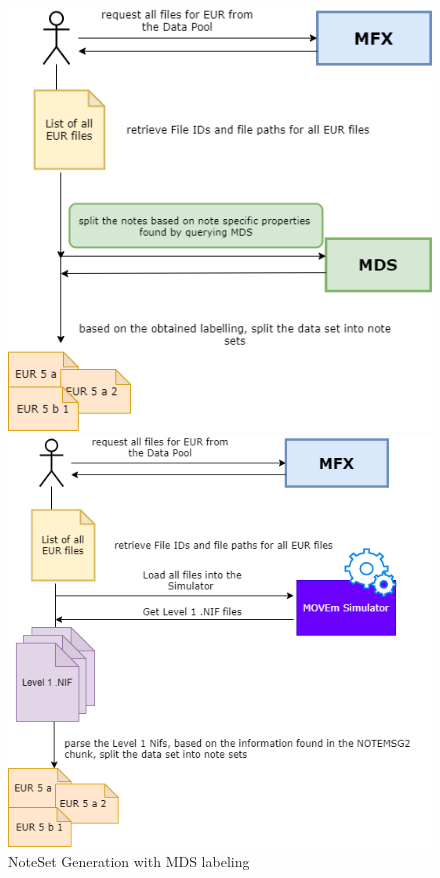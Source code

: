 \begin{figure}[!htb]
  \includegraphics[width=\linewidth]{images/label_mds_approach.png}
  \caption{NoteSet Generation with MDS labeling}\label{fig:ns_mds}
\endminipage\hfill
{}
  \includegraphics[width=\linewidth]{images/label_simulator_approach.png}

\end{figure}
